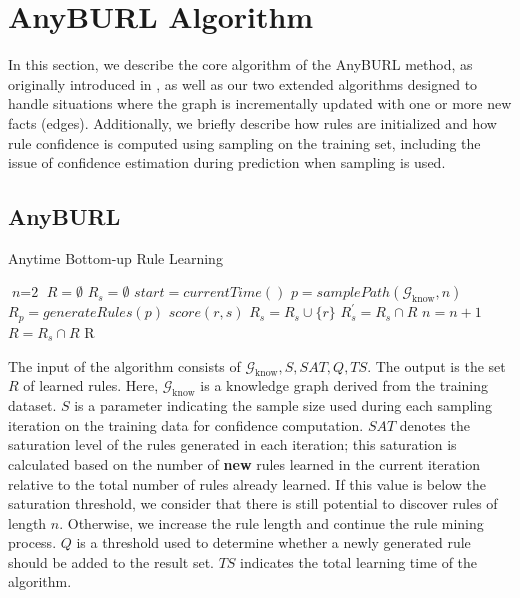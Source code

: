 \section{AnyBURL Algorithm} \label{myalgorithm}
In this section, we describe the core algorithm of the AnyBURL method, as originally introduced in \cite{burl}, as well as our two extended algorithms designed to handle situations where the graph is incrementally updated with one or more new facts (edges). Additionally, we briefly describe how rules are initialized and how rule confidence is computed using sampling on the training set, including the issue of confidence estimation during prediction when sampling is used.


\subsection{AnyBURL}
\begin{algorithm}
	\caption{Anytime Bottom-up Rule Learning}\label{algorithm1}
	\begin{algorithmic}[1]
		\State $\textit{n} = \text{2}$
		\State $R = \emptyset$
		\Loop
		\State $R_s = \emptyset$
		\State $start = currentTime()$
		\Repeat
		\State $p = samplePath(\mathcal{G}_{\text{know}}, n)$
		\State $R_p = generateRules(p)$
		\State $score(r, s)$
		\State $R_s = R_s \cup \{r\}$
		\EndIf
		\EndFor
		\State $R^{\prime}_s = R_s \cap R$
		\State $n = n + 1$
		\EndIf
		\State $R = R_s \cap R$
		\EndLoop
		\Return R
		\EndProcedure
	\end{algorithmic}
\end{algorithm}

The input of the algorithm consists of \(\mathcal{G}_{\text{know}}, S, SAT, Q, TS\). The output is the set \(R\) of learned rules. Here, \(\mathcal{G}_{\text{know}}\) is a knowledge graph derived from the training dataset. \(S\) is a parameter indicating the sample size used during each sampling iteration on the training data for confidence computation. \(SAT\) denotes the saturation level of the rules generated in each iteration; this saturation is calculated based on the number of \textbf{new} rules learned in the current iteration relative to the total number of rules already learned. If this value is below the saturation threshold, we consider that there is still potential to discover rules of length \(n\). Otherwise, we increase the rule length and continue the rule mining process. \(Q\) is a threshold used to determine whether a newly generated rule should be added to the result set. \(TS\) indicates the total learning time of the algorithm.

